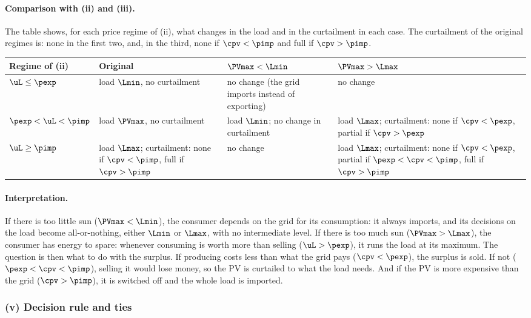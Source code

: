 \paragraph{Comparison with (ii) and (iii).}
The table shows, for each price regime of (ii), what changes in the load and in the
curtailment in each case. The curtailment of the original regimes is: none in the first two,
and, in the third, none if $\cpv < \pimp$ and full if $\cpv > \pimp$.
\begin{center}
\small
\begin{tabularx}{\textwidth}{lXXX}
    \toprule
    Regime of (ii) & Original & $\PVmax < \Lmin$ & $\PVmax > \Lmax$ \\
    \midrule
    $\uL \leq \pexp$
    & load $\Lmin$, no curtailment
    & no change (the grid imports instead of exporting)
    & no change \\
    $\pexp < \uL < \pimp$
    & load $\PVmax$, no curtailment
    & load $\Lmin$; no change in curtailment
    & load $\Lmax$; curtailment: none if $\cpv < \pexp$, partial if $\cpv > \pexp$ \\
    $\uL \geq \pimp$
    & load $\Lmax$; curtailment: none if $\cpv < \pimp$, full if $\cpv > \pimp$
    & no change
    & load $\Lmax$; curtailment: none if $\cpv < \pexp$, partial if $\pexp < \cpv < \pimp$, full
    if $\cpv > \pimp$ \\
    \bottomrule
\end{tabularx}
\end{center}

\paragraph{Interpretation.}
If there is too little sun ($\PVmax < \Lmin$), the consumer depends on the grid for its
consumption: it always imports, and its decisions on the load become all-or-nothing, either
$\Lmin$ or $\Lmax$, with no intermediate level. If there is too much sun ($\PVmax > \Lmax$),
the consumer has energy to spare: whenever consuming is worth more than selling
($\uL > \pexp$), it runs the load at its maximum. The question is then what to do with the
surplus. If producing costs less than what the grid pays ($\cpv < \pexp$), the surplus is
sold. If not ($\pexp < \cpv < \pimp$), selling it would lose money, so the PV is curtailed to
what the load needs. And if the PV is more expensive than the grid ($\cpv > \pimp$), it is
switched off and the whole load is imported.

\subsubsection{(v) Decision rule and ties}
